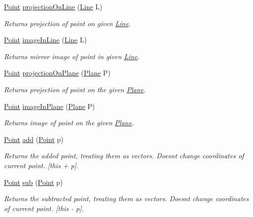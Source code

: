 \begin{DoxyCompactItemize}
\mbox{\hyperlink{class_point}{Point}} \mbox{\hyperlink{class_point_a61cefcc9a49eed720f97ccea7bed5981}{projection\+On\+Line}} (\mbox{\hyperlink{class_line}{Line}} L)
\begin{DoxyCompactList}\small\item\em Returns projection of point on given \mbox{\hyperlink{class_line}{Line}}. \end{DoxyCompactList}\item 
\mbox{\hyperlink{class_point}{Point}} \mbox{\hyperlink{class_point_a6db21f293bd4a7eab01b04882a5021fd}{image\+In\+Line}} (\mbox{\hyperlink{class_line}{Line}} L)
\begin{DoxyCompactList}\small\item\em Returns mirror image of point in given \mbox{\hyperlink{class_line}{Line}}. \end{DoxyCompactList}\item 
\mbox{\hyperlink{class_point}{Point}} \mbox{\hyperlink{class_point_a1085bffb18e2e514d415cdcc2fdb0aff}{projection\+On\+Plane}} (\mbox{\hyperlink{class_plane}{Plane}} P)
\begin{DoxyCompactList}\small\item\em Returns projection of point on the given \mbox{\hyperlink{class_plane}{Plane}}. \end{DoxyCompactList}\item 
\mbox{\hyperlink{class_point}{Point}} \mbox{\hyperlink{class_point_a2350375c6bb6c3bb810ae79c99d2a53c}{image\+In\+Plane}} (\mbox{\hyperlink{class_plane}{Plane}} P)
\begin{DoxyCompactList}\small\item\em Returns image of point on the given \mbox{\hyperlink{class_plane}{Plane}}. \end{DoxyCompactList}\item 
\mbox{\hyperlink{class_point}{Point}} \mbox{\hyperlink{class_point_a8a2ee9e0febd224f86391229e77c2aee}{add}} (\mbox{\hyperlink{class_point}{Point}} p)
\begin{DoxyCompactList}\small\item\em Returns the added point, treating them as vectors. Doesn\textquotesingle{}t change coordinates of current point. \mbox{[}this + p\mbox{]}. \end{DoxyCompactList}\item 
\mbox{\hyperlink{class_point}{Point}} \mbox{\hyperlink{class_point_ab1d94b20de98b5e73345599d33145195}{sub}} (\mbox{\hyperlink{class_point}{Point}} p)
\begin{DoxyCompactList}\small\item\em Returns the subtracted point, treating them as vectors. Doesn\textquotesingle{}t change coordinates of current point. \mbox{[}this -\/ p\mbox{]}. \end{DoxyCompactList}\item 

\end{DoxyCompactItemize}
